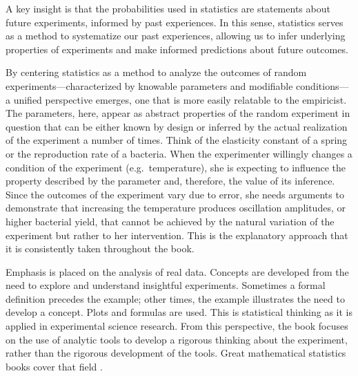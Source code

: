 \documentclass[
]{book}
\begin{document}
A key insight is that the probabilities used in statistics are statements about future experiments, informed by past experiences. In this sense, statistics serves as a method to systematize our past experiences, allowing us to infer underlying properties of experiments and make informed predictions about future outcomes.

By centering statistics as a method to analyze the outcomes of random experiments---characterized by knowable parameters and modifiable conditions---a unified perspective emerges, one that is more easily relatable to the empiricist. The parameters, here, appear as abstract properties of the random experiment in question that can be either known by design or inferred by the actual realization of the experiment a number of times. Think of the elasticity constant of a spring or the reproduction rate of a bacteria. When the experimenter willingly changes a condition of the experiment (e.g.~temperature), she is expecting to influence the property described by the parameter and, therefore, the value of its inference. Since the outcomes of the experiment vary due to error, she needs arguments to demonstrate that increasing the temperature produces oscillation amplitudes, or higher bacterial yield, that cannot be achieved by the natural variation of the experiment but rather to her intervention. This is the explanatory approach that it is consistently taken throughout the book.

Emphasis is placed on the analysis of real data. Concepts are developed from the need to explore and understand insightful experiments. Sometimes a formal definition precedes the example; other times, the example illustrates the need to develop a concept. Plots and formulas are used. This is statistical thinking as it is applied in experimental science research. From this perspective, the book focuses on the use of analytic tools to develop a rigorous thinking about the experiment, rather than the rigorous development of the tools. Great mathematical statistics books cover that field \citep{davison2003statistical, MillerFreund2014, casella2002statistical}.
\end{document}
